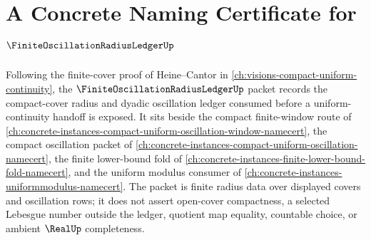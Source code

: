 \chapter{A Concrete Naming Certificate for $\FiniteOscillationRadiusLedgerUp$}
\label{ch:concrete-instances-finite-oscillation-radius-ledger-namecert}

Following the finite-cover proof of Heine--Cantor in \autoref{ch:visions-compact-uniform-continuity}, the $\FiniteOscillationRadiusLedgerUp$ packet records the compact-cover radius and dyadic oscillation ledger consumed before a uniform-continuity handoff is exposed. It sits beside the compact finite-window route of \autoref{ch:concrete-instances-compact-uniform-oscillation-window-namecert}, the compact oscillation packet of \autoref{ch:concrete-instances-compact-uniform-oscillation-namecert}, the finite lower-bound fold of \autoref{ch:concrete-instances-finite-lower-bound-fold-namecert}, and the uniform modulus consumer of \autoref{ch:concrete-instances-uniformmodulus-namecert}. The packet is finite radius data over displayed covers and oscillation rows; it does not assert open-cover compactness, a selected Lebesgue number outside the ledger, quotient map equality, countable choice, or ambient $\RealUp$ completeness.

